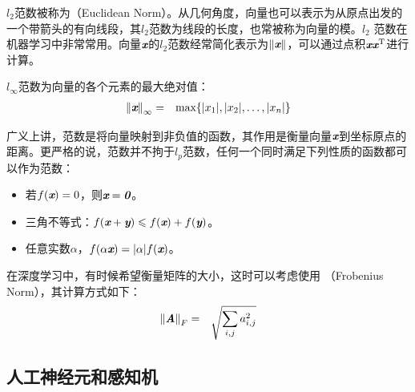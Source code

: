 \parinterval $ l_2 $范数被称为{\small{}}（Euclidean Norm）。从几何角度，向量也可以表示为从原点出发的一个带箭头的有向线段，其$ l_2 $范数为线段的长度，也常被称为向量的模。$ l_2 $ 范数在机器学习中非常常用。向量$ {\textbf{\em x}} $的$ l_2 $范数经常简化表示为$ \Vert{\textbf{\em x}}\Vert $，可以通过点积$ {{\textbf{\em x}} \textbf{\em x}}^{\textrm T} $进行计算。

\parinterval $ l_{\infty} $范数为向量的各个元素的最大绝对值：
\begin{eqnarray}
{\Vert{\textbf{\em x}}\Vert}_{\infty}&=&{\textrm{max}}\{\vert x_1\vert,\vert x_2\vert,\dots,\vert x_n\vert\}
\label{eq:9-17}
\end{eqnarray}

\parinterval 广义上讲，范数是将向量映射到非负值的函数，其作用是衡量向量$ {\textbf{\em x}} $到坐标原点的距离。更严格的说，范数并不拘于$ l_p $范数，任何一个同时满足下列性质的函数都可以作为范数：

\begin{itemize}
\vspace{0.5em}
\item 若$ f({\textbf{\em x}})=0 $，则$ {\textbf{\em x}}={\textbf{\em 0}} $。
\vspace{0.5em}
\item 三角不等式：$ f({\textbf{\em x}}+{\textbf{\em y}})\leqslant f({\textbf{\em x}})+f({\textbf{\em y}}) $。
\vspace{0.5em}
\item 任意实数$ \alpha $，$ f(\alpha {\textbf{\em x}})=\vert \alpha \vert f({\textbf{\em x}}) $。
\vspace{0.5em}
\end{itemize}

\parinterval 在深度学习中，有时候希望衡量矩阵的大小，这时可以考虑使用 {\small{}}（Frobenius Norm），其计算方式如下：
\begin{eqnarray}
{\Vert{\textbf{\em A}}\Vert}_F&=&\sqrt{\sum_{i,j} a_{i,j}^2}
\label{eq:9-18}
\end{eqnarray}

\subsection{人工神经元和感知机}

